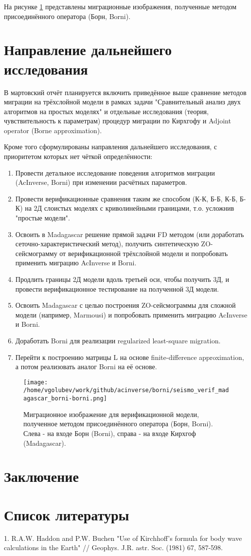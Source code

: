\documentclass{article}
\begin{document}
На рисунке \ref{seismo_verif_madagascar_borni-borni} представлены миграционные изображения, полученные методом присоединённого оператора (Борн, Borni).

\section{Направление дальнейшего исследования}

В мартовский отчёт планируется включить приведённое выше сравнение методов миграции на трёхслойной модели в рамках задачи "Сравнительный анализ двух алгоритмов на простых моделях" и отдельные исследования (теория, чувствительность к параметрам) процедур миграции по Кирхгофу и Adjoint operator (Borne approximation).

Кроме того сформулированы направления дальнейшего исследования, с приоритетом которых нет чёткой определённости: 

\begin{enumerate}
\item Провести детальное исследование поведения алгоритмов миграции (AcInverse, Borni) при изменении расчётных параметров.
\item Провести верификационные сравнения таким же способом (К-К, Б-Б, К-Б, Б-К) на 2Д слоистых моделях с криволинейными границами, т.о. усложнив "простые модели".
\item Освоить в Madagascar решение прямой задачи FD методом (или доработать сеточно-характеристический метод), получить синтетическую ZO-сейсмограмму от верификационной трёхслойной модели и попробовать применить миграцию AcInverse и Borni.
\item Продлить границы 2Д модели вдоль третьей оси, чтобы получить 3Д, и провести верификационное тестирование на полученной 3Д модели.
\item Освоить Madagascar с целью построения ZO-сейсмограммы для сложной модели (например, Marmousi) и попробовать применить миграцию AcInverse и Borni.
\item Доработать Borni для реализации regularized least-square migration.
\item Перейти к построению матрицы L на основе finite-difference approximation, а потом реализовать аналог Borni на её основе.
\end{enumerate}

\begin{figure}[ht]\center
\texttt{[image: /home/vgolubev/work/github/acinverse/borni/seismo\_verif\_madagascar\_borni-borni.png]}
\caption{Миграционное изображение для верификационной модели, полученное методом присоединённого оператора (Борн, Borni). Слева - на входе Борн (Borni), справа - на входе Кирхгоф (Madagascar).}
\label{seismo_verif_madagascar_borni-borni}
\end{figure}


\section{Заключение}

\section{Список литературы}
1. R.A.W. Haddon and P.W. Buchen "Use of Kirchhoff's formula for body wave calculations in the Earth" // Geophys. J.R. astr. Soc. (1981) 67, 587-598.

\fi
\end{document}
